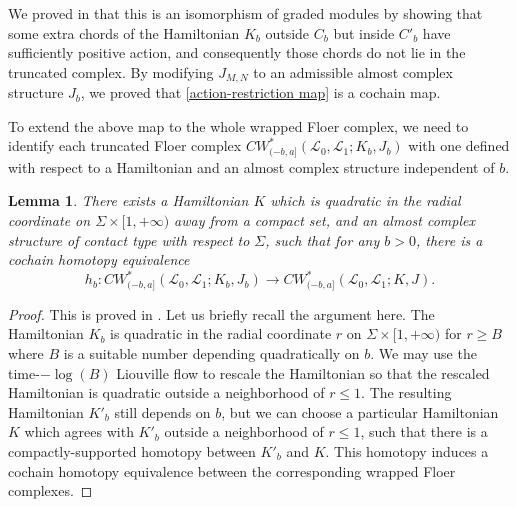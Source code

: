 \documentclass{amsart}
\newtheorem{lemma}[theorem]{Lemma}
\numberwithin{equation}{section}
\numberwithin{figure}{section}
\begin{document}
	We proved in \cite{Gao1} that this is an isomorphism of graded modules by showing that some extra chords of the Hamiltonian $K_{b}$ outside $C_{b}$ but inside $C'_{b}$ have sufficiently positive action, and consequently those chords do not lie in the truncated complex. By modifying $J_{M, N}$ to an admissible almost complex structure $J_{b}$, we proved that \eqref{action-restriction map} is a cochain map. \par
	To extend the above map to the whole wrapped Floer complex, we need to identify each truncated Floer complex $CW^{*}_{(-b, a]}(\mathcal{L}_{0}, \mathcal{L}_{1}; K_{b}, J_{b})$ with one defined with respect to a Hamiltonian and an almost complex structure independent of $b$. \par

\begin{lemma}
	There exists a Hamiltonian $K$ which is quadratic in the radial coordinate on $\Sigma \times [1, +\infty)$ away from a compact set, and an almost complex structure of contact type with respect to $\Sigma$, such that for any $b > 0$, there is a cochain homotopy equivalence
\begin{equation}
h_{b}: CW^{*}_{(-b, a]}(\mathcal{L}_{0}, \mathcal{L}_{1}; K_{b}, J_{b}) \to CW^{*}_{(-b, a]}(\mathcal{L}_{0}, \mathcal{L}_{1}; K, J).
\end{equation}
\end{lemma}
\begin{proof}
	This is proved in \cite{Gao1}. Let us briefly recall the argument here. The Hamiltonian $K_{b}$ is quadratic in the radial coordinate $r$ on $\Sigma \times [1, +\infty)$ for $r \ge B$ where $B$ is a suitable number depending quadratically on $b$. We may use the time-$-\log(B)$ Liouville flow to rescale the Hamiltonian so that the rescaled Hamiltonian is quadratic outside a neighborhood of $r \le 1$. The resulting Hamiltonian $K'_{b}$ still depends on $b$, but we can choose a particular Hamiltonian $K$ which agrees with $K'_{b}$ outside a neighborhood of $r \le 1$, such that there is a compactly-supported homotopy between $K'_{b}$ and $K$. This homotopy induces a cochain homotopy equivalence between the corresponding wrapped Floer complexes.
\end{proof}
\end{document}
